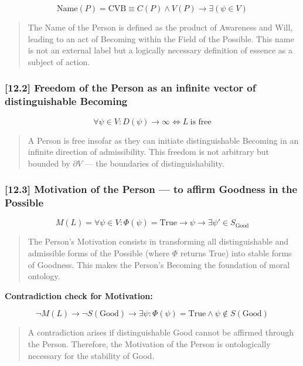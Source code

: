 \documentclass[12pt]{article}
\begin{document}
\[
\text{Name}(P) = \text{CVB} \equiv C(P) \land V(P) \rightarrow \exists (\psi \in V)
\]

\begin{quote}
The Name of the Person is defined as the product of Awareness and Will, leading to an act of Becoming within the Field of the Possible. This name is not an external label but a logically necessary definition of essence as a subject of action.
\end{quote}

\subsubsection*{[12.2] Freedom of the Person as an infinite vector of distinguishable Becoming}

\[
\forall \psi \in V : D(\psi) \rightarrow \infty \iff L\ \text{is free}
\]

\begin{quote}
A Person is free insofar as they can initiate distinguishable Becoming in an infinite direction of admissibility. This freedom is not arbitrary but bounded by $\partial V$ — the boundaries of distinguishability.
\end{quote}

\subsubsection*{[12.3] Motivation of the Person — to affirm Goodness in the Possible}

\[
M(L) = \forall \psi \in V : \Phi(\psi) = \text{True} \rightarrow \psi \rightarrow \exists \psi' \in S_{\text{Good}}
\]

\begin{quote}
The Person’s Motivation consists in transforming all distinguishable and admissible forms of the Possible (where $\Phi$ returns True) into stable forms of Goodness. This makes the Person’s Becoming the foundation of moral ontology.
\end{quote}

\textbf{Contradiction check for Motivation:}

\[
\neg M(L) \rightarrow \neg S(\text{Good}) \rightarrow \exists \psi: \Phi(\psi) = \text{True} \wedge \psi \notin S(\text{Good})
\]

\begin{quote}
A contradiction arises if distinguishable Good cannot be affirmed through the Person. Therefore, the Motivation of the Person is ontologically necessary for the stability of Good.
\end{quote}
\end{document}
